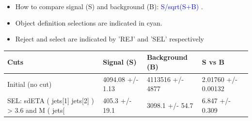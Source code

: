 \documentclass[a4paper, 10pt]{article}
\begin{document}
\begin{itemize}
  \item How to compare signal (S) and background (B): \textcolor{blue}{S/\-sqrt(S+B)} .
   \item Object definition selections are indicated in cyan.  \item Reject and select are indicated by 'REJ' and 'SEL' respectively
\end{itemize}
\begin{table}[H]
  \begin{center}
    \begin{tabular}{|m{36.0mm}|m{36.0mm}|m{36.0mm}|m{33.0mm}|}
      \hline
      {\cellcolor{yellow}        Cuts}& {\cellcolor{yellow}         Signal (S)}& {\cellcolor{yellow}         Background (B)}& {\cellcolor{yellow}         S vs B}\\
      \hline
      {\cellcolor{white}         Initial (no cut)}& {\cellcolor{white}         4094.08 +/\-- 1.13}& {\cellcolor{white}         4113516 +/\-- 4877}& {\cellcolor{white}         2.01760 +/\-- 0.00132}\\
      \hline
      {\cellcolor{white} SEL: sdETA ( jets[1] jets[2] ) > 3.6 and M ( jets[}& {\cellcolor{white}         405.3 +/\-- 19.1}& {\cellcolor{white}         3098.1 +/\-- 54.7}& {\cellcolor{white}         6.847 +/\-- 0.309}\\
\hline
    \end{tabular}
  \end{center}
\end{table}
\end{document}
